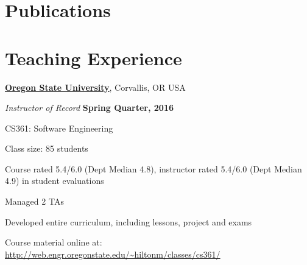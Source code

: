 \documentclass[10pt]{article}
\begin{document}
\vspace{-5pt}

%
%
%



\section{Publications}

\begin{publications}

\end{publications}
\vspace{-10pt}

\section{Teaching Experience}

\href{http://www.oregonstate.edu/}{\textbf{Oregon State University}},
Corvallis, OR USA
\begin{outerlist}
\item[] \textit{Instructor of Record}%
    \hfill \textbf{Spring Quarter, 2016}
    \begin{innerlist}%
       \item CS361: Software Engineering %
       \item Class size: 85 students 
       \item Course rated 5.4/6.0 (Dept Median 4.8), instructor rated 5.4/6.0 (Dept Median 4.9) in student evaluations
       \item Managed 2 TAs
       \item Developed entire curriculum, including lessons, project and exams
       \item Course material online at:\\ \url{http://web.engr.oregonstate.edu/~hiltonm/classes/cs361/}  
     \end{innerlist}
\end{outerlist}
\vspace{10pt}
\end{document}
